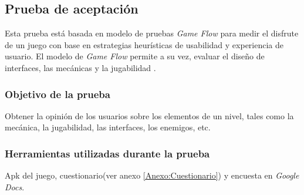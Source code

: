 \subsection{Prueba de aceptación}
Esta prueba está basada en modelo de pruebas \textit{Game Flow} para medir el
disfrute de un juego con base en estrategias heurísticas de usabilidad y experiencia
de usuario. El modelo de \textit{Game Flow} permite a su vez, evaluar el diseño de
interfaces, las mecánicas y la jugabilidad \cite{gameflow}.
\subsubsection{Objetivo de la prueba}
Obtener la opinión de los usuarios sobre los elementos de un nivel, tales como
la mecánica, la jugabilidad, las interfaces, los enemigos, etc.
\subsubsection{Herramientas utilizadas durante la prueba}
Apk del juego, cuestionario(ver anexo \ref{Anexo:Cuestionario}) y encuesta en \textit{Google Docs}.
